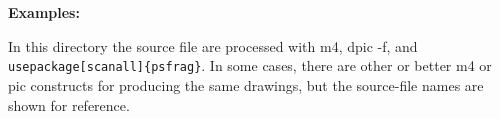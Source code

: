 \documentclass[11pt]{article}
\begin{document}
  \hfill
  {\large\bf Examples:
    
    }
  \hfill\break

  In this directory the source file are processed with m4, dpic -f,
  and {\tt{} usepackage[scanall]\{psfrag\}}.
  In some cases, there are other or better m4 or pic constructs for
  producing the same drawings, but the source-file names are shown for
  reference.


\end{document}
